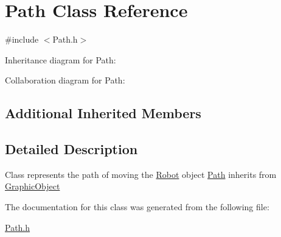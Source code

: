 \hypertarget{classPath}{}\section{Path Class Reference}
\label{classPath}


{\ttfamily \#include $<$Path.\+h$>$}



Inheritance diagram for Path\+:


Collaboration diagram for Path\+:
\subsection*{Additional Inherited Members}


\subsection{Detailed Description}
Class represents the path of moving the \hyperlink{classRobot}{Robot} object \hyperlink{classPath}{Path} inherits from \hyperlink{classGraphicObject}{Graphic\+Object} 

The documentation for this class was generated from the following file\+:\begin{DoxyCompactItemize}
\item 
\hyperlink{Path_8h}{Path.\+h}\end{DoxyCompactItemize}
